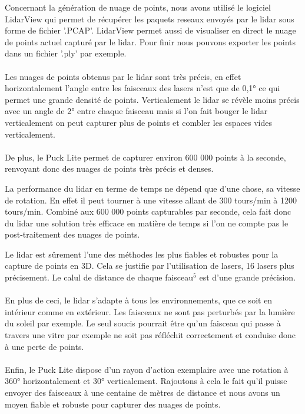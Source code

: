             \normalsize{
                Concernant la génération de nuage de points, nous avons utilisé le logiciel LidarView qui permet de récupérer les paquets reseaux envoyés par le lidar sous forme de fichier '.PCAP'. LidarView permet aussi de visualiser en direct le nuage de points actuel capturé par le lidar. Pour finir nous pouvons exporter les points dans un fichier '.ply' par exemple.
            }
            \\ \\
            \normalsize{
                Les nuages de points obtenus par le lidar sont très précis, en effet horizontalement l'angle entre les faisceaux des lasers n'est que de 0,1° ce qui permet une grande densité de points. Verticalement le lidar se révèle moins précis avec un angle de 2° entre chaque faisceau mais si l'on fait bouger le lidar verticalement on peut capturer plus de points et combler les espaces vides verticalement.
            }
            \\ \\
            \normalsize{
                De plus, le Puck Lite permet de capturer environ 600 000 points à la seconde, renvoyant donc des nuages de points très précis et denses.
            }

            \normalsize{
                La performance du lidar en terme de temps ne dépend que d'une chose, sa vitesse de rotation. En effet il peut tourner à une vitesse allant de 300 tours/min à 1200 tours/min. Combiné aux 600 000 points capturables par seconde, cela fait donc du lidar une solution très efficace en matière de temps si l'on ne compte pas le post-traitement des nuages de points.
            }
        
            \normalsize{
                Le lidar est sûrement l'une des méthodes les plus fiables et robustes pour la capture de points en 3D. Cela se justifie par l'utilisation de lasers, 16 lasers plus précisement. Le calul de distance de chaque faisceau$^5$ est d'une grande précision.
            }
            \\ \\
            \normalsize{
                En plus de ceci, le lidar s'adapte à tous les environnements, que ce soit en intérieur comme en extérieur. Les faisceaux ne sont pas perturbés par la lumière du soleil par exemple. Le seul soucis pourrait être qu'un faisceau qui passe à travers une vitre par exemple ne soit pas réfléchit correctement et conduise donc à une perte de points.
            }
            \\ \\
            \normalsize{
                Enfin, le Puck Lite dispose d'un rayon d'action exemplaire avec une rotation à 360° horizontalement et 30° verticalement. Rajoutons à cela le fait qu'il puisse envoyer des faisceaux à une centaine de mètres de distance et nous avons un moyen fiable et robuste pour capturer des nuages de points.
            }

